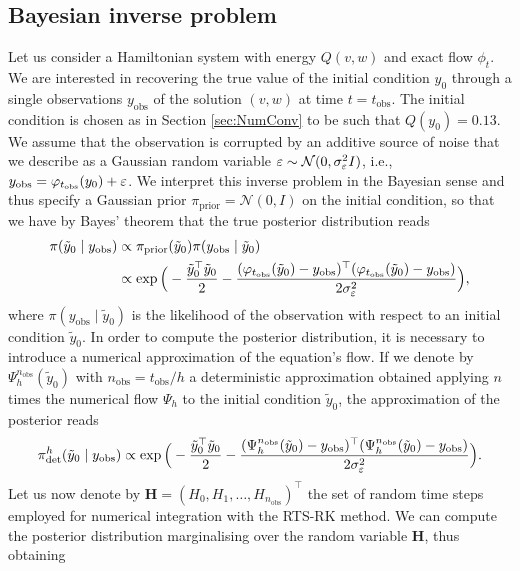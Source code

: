 \documentclass[10pt]{article}
\begin{document}
\subsection{Bayesian inverse problem} Let us consider a Hamiltonian system with energy $Q(v,w)$ and exact flow $\phi_t$. We are interested in recovering the true value of the initial condition $y_0$ through a single observations $y_{\mathrm{obs}}$ of the solution $(v, w)$ at time $t = t_{\mathrm{obs}}$. The initial condition is chosen as in Section \ref{sec:NumConv} to be such that $Q(y_0) = 0.13$. We assume that the observation is corrupted by an additive source of noise that we describe as a Gaussian random variable $\varepsilon \sim \mathcal{N}(0, \sigma_\varepsilon^2 I)$, i.e., $y_{\mathrm{obs}} = \varphi_{t_{\mathrm{obs}}}(y_0) + \varepsilon$. We interpret this inverse problem in the Bayesian sense and thus specify a Gaussian prior $\pi_{\mathrm{prior}} = \mathcal{N}(0, I)$ on the initial condition, so that we have by Bayes' theorem that the true posterior distribution reads
\begin{equation}\label{eq:PosteriorExact}
\begin{aligned}
	\pi(\tilde y_0 \mid y_{\mathrm{obs}}) &\propto \pi_{\mathrm{prior}}(\tilde y_0) \pi(y_{\mathrm{obs}} \mid \tilde y_0)\\
	&\propto \exp\Big(-\frac{\tilde y_0^\top \tilde y_0}{2} -\frac{(\varphi_{t_{\mathrm{obs}}}(\tilde y_0) - y_{\mathrm{obs}})^\top(\varphi_{t_{\mathrm{obs}}}(\tilde y_0) - y_{\mathrm{obs}})}{2\sigma_\varepsilon^2}\Big),
\end{aligned}
\end{equation}
where $\pi(y_{\mathrm{obs}} \mid \tilde y_0)$ is the likelihood of the observation with respect to an initial condition $\tilde y_0$. In order to compute the posterior distribution, it is necessary to introduce a numerical approximation of the equation's flow. If we denote by $\Psi_h^{n_{\mathrm{obs}}}(\tilde y_0)$ with $n_{\mathrm{obs}} = t_{\mathrm{obs}} / h$ a deterministic approximation obtained applying $n$ times the numerical flow $\Psi_h$ to the initial condition $\tilde y_0$, the approximation of the posterior reads
\begin{equation}\label{eq:PosteriorDet}
	\pi^h_{\mathrm{det}}(\tilde y_0 \mid y_{\mathrm{obs}}) \propto \exp\Big(-\frac{\tilde y_0^\top \tilde y_0}{2} -\frac{(\Psi_h^{n_{\mathrm{obs}}}(\tilde y_0) - y_{\mathrm{obs}})^\top(\Psi_h^{n_{\mathrm{obs}}}(\tilde y_0) - y_{\mathrm{obs}})}{2\sigma_\varepsilon^2}\Big).
\end{equation}
Let us now denote by $\mathbf{H} = (H_0, H_1, \ldots, H_{n_\mathrm{obs}})^\top$ the set of random time steps employed for numerical integration with the RTS-RK method. We can compute the posterior distribution marginalising over the random variable $\mathbf{H}$, thus obtaining
\end{document}
